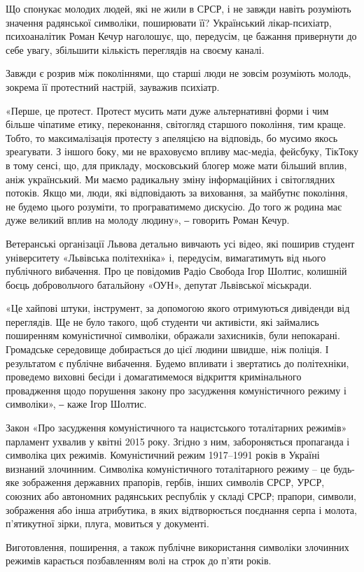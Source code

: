 \begin{multicols}{2}

Що спонукає молодих людей, які не жили в СРСР, і не завжди навіть розуміють
значення радянської символіки, поширювати її? Український лікар-психіатр,
психоаналітик Роман Кечур наголошує, що, передусім, це бажання привернути до
себе увагу, збільшити кількість переглядів на своєму каналі.

Завжди є розрив між поколіннями, що старші люди не зовсім розуміють молодь,
зокрема її протестний настрій, зауважив психіатр.

«Перше, це протест. Протест мусить мати дуже альтернативні форми і чим більше
чіпатиме етику, переконання, світогляд старшого покоління, тим краще. Тобто, то
максималізація протесту з апеляцією на відповідь, бо мусимо якось зреагувати. З
іншого боку, ми не враховуємо впливу мас-медіа, фейсбуку, ТікТоку в тому сенсі,
що, для прикладу, московський блогер може мати більший вплив, аніж український.
Ми маємо радикальну зміну інформаційних і світоглядних потоків. Якщо ми, люди,
які відповідають за виховання, за майбутнє покоління, не будемо цього розуміти,
то програватимемо дискусію. До того ж родина має дуже великий вплив на молоду
людину», ‒ говорить Роман Кечур.

Ветеранські організації Львова детально вивчають усі відео, які поширив студент
університету «Львівська політехніка» і, передусім, вимагатимуть від нього
публічного вибачення. Про це повідомив Радіо Свобода Ігор Шолтис, колишній
боєць добровольчого батальйону «ОУН», депутат Львівської міськради.

«Це хайпові штуки, інструмент, за допомогою якого отримуються дивіденди від
переглядів. Ще не було такого, щоб студенти чи активісти, які займались
поширенням комуністичної символіки, ображали захисників, були непокарані.
Громадське середовище добирається до цієї людини швидше, ніж поліція. І
результатом є публічне вибачення. Будемо впливати і звертатись до політехніки,
проведемо виховні бесіди і домагатимемося відкриття кримінального провадження
щодо порушення закону про засудження комуністичного режиму і символіки», ‒ каже
Ігор Шолтис.

Закон «Про засудження комуністичного та нацистського тоталітарних режимів»
парламент ухвалив у квітні 2015 року. Згідно з ним, забороняється пропаганда і
символіка цих режимів. Комуністичний режим 1917–1991 років в Україні визнаний
злочинним. Символіка комуністичного тоталітарного режиму – це будь-яке
зображення державних прапорів, гербів, інших символів СРСР, УРСР, союзних або
автономних радянських республік у складі СРСР; прапори, символи, зображення або
інша атрибутика, в яких відтворюється поєднання серпа і молота, п’ятикутної
зірки, плуга, мовиться у документі.

Виготовлення, поширення, а також публічне використання символіки злочинних
режимів карається позбавленням волі на строк до п’яти років.


\end{multicols}
